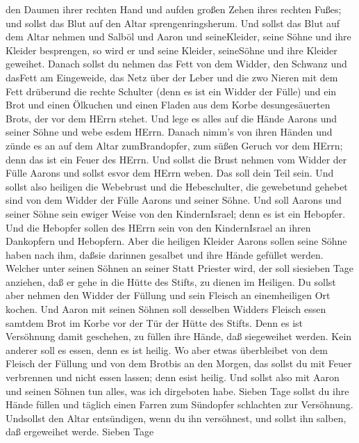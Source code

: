 den Daumen ihrer rechten Hand und aufden großen Zehen ihres rechten
Fußes; und sollst das Blut auf den Altar sprengenringsherum.
 Und sollst das Blut auf dem Altar nehmen und Salböl und
Aaron und seineKleider, seine Söhne und ihre Kleider besprengen, so wird
er und seine Kleider, seineSöhne und ihre Kleider geweihet.
 Danach sollst du nehmen das Fett von dem Widder, den
Schwanz und dasFett am Eingeweide, das Netz über der Leber und die zwo
Nieren mit dem Fett drüberund die rechte Schulter (denn es ist ein
Widder der Fülle)  und ein Brot und einen Ölkuchen und
einen Fladen aus dem Korbe desungesäuerten Brots, der vor dem HErrn
stehet.  Und lege es alles auf die Hände Aarons und seiner
Söhne und webe esdem HErrn.  Danach nimm's von ihren Händen
und zünde es an auf dem Altar zumBrandopfer, zum süßen Geruch vor dem
HErrn; denn das ist ein Feuer des HErrn.  Und sollst die
Brust nehmen vom Widder der Fülle Aarons und sollst esvor dem HErrn
weben. Das soll dein Teil sein.  Und sollst also heiligen
die Webebrust und die Hebeschulter, die gewebetund gehebet sind von dem
Widder der Fülle Aarons und seiner Söhne.  Und soll Aarons
und seiner Söhne sein ewiger Weise von den KindernIsrael; denn es ist
ein Hebopfer. Und die Hebopfer sollen des HErrn sein von den
KindernIsrael an ihren Dankopfern und Hebopfern.  Aber die
heiligen Kleider Aarons sollen seine Söhne haben nach ihm, daßsie
darinnen gesalbet und ihre Hände gefüllet werden.  Welcher
unter seinen Söhnen an seiner Statt Priester wird, der soll siesieben
Tage anziehen, daß er gehe in die Hütte des Stifts, zu dienen im
Heiligen.  Du sollst aber nehmen den Widder der Füllung und
sein Fleisch an einemheiligen Ort kochen.  Und Aaron mit
seinen Söhnen soll desselben Widders Fleisch essen samtdem Brot im Korbe
vor der Tür der Hütte des Stifts.  Denn es ist Versöhnung
damit geschehen, zu füllen ihre Hände, daß siegeweihet werden. Kein
anderer soll es essen, denn es ist heilig.  Wo aber etwas
überbleibet von dem Fleisch der Füllung und von dem Brotbis an den
Morgen, das sollst du mit Feuer verbrennen und nicht essen lassen; denn
esist heilig.  Und sollst also mit Aaron und seinen Söhnen
tun alles, was ich dirgeboten habe. Sieben Tage sollst du ihre Hände
füllen  und täglich einen Farren zum Sündopfer schlachten
zur Versöhnung. Undsollst den Altar entsündigen, wenn du ihn versöhnest,
und sollst ihn salben, daß ergeweihet werde.  Sieben Tage
